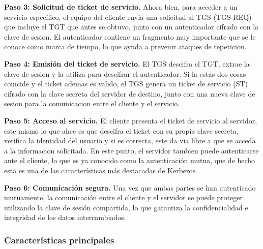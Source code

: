 \documentclass[letterpaper,12pt]{article}
\begin{document}
\textbf{Paso 3: Solicitud de ticket de servicio.} Ahora bien, para acceder a un servicio espec\'ifico, el equipo del cliente
envia una solicitud al TGS (TGS-REQ) que incluye el TGT que antes se obtuvo, junto con un autenticador cifrado con la 
clave de sesion. El autenticador contiene un fragmento muy importante que se le conoce como marca de tiempo, lo que ayuda a prevenir ataques de repeticion.

\textbf{Paso 4: Emisi\'on del ticket de servicio.} El TGS descifra el TGT, extrae la clave de sesion y la 
utiliza para descifrar el autenticador. 
Si la estas dos cosas coincide y el ticket ademas es valido, el TGS genera un ticket de servicio (ST) 
cifrado con la clave secreta del servidor de destino, junto con una nueva clave de sesion para la comunicacion 
entre el cliente y el servicio.

\textbf{Paso 5: Acceso al servicio.} El cliente presenta el ticket de servicio al servidor, este mismo lo que ahce es que
descifra el ticket con su propia clave secreta, verifica la identidad del usuario y si es correcta, este da via libre a que se acceda a la informacion solicitada.
En este punto, el servidor tambien puede autenticarse ante el cliente, 
lo que es ya conocido como la autenticaci\'on mutua, que de hecho esta es una de las caracter\'isticas m\'as destacadas de Kerberos.

\textbf{Paso 6: Comunicaci\'on segura.} Una vez que ambas partes se han autenticado mutuamente, la comunicaci\'on entre el cliente y el servidor se puede proteger utilizando la clave de sesi\'on compartida, lo que garantiza la confidencialidad e integridad de los datos intercambiados.

\subsubsection{Caracter\'isticas principales}
\end{document}
